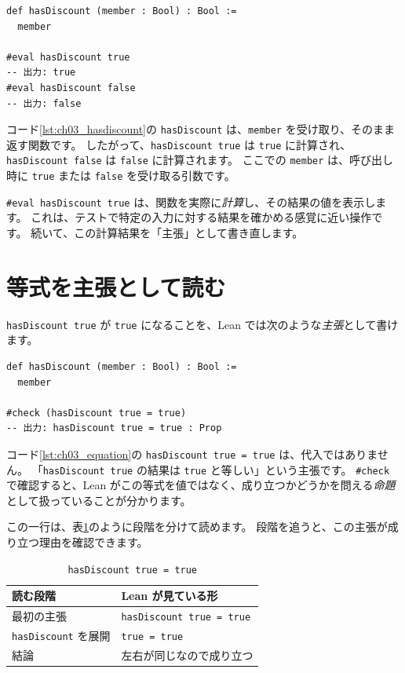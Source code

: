 \begin{listing}[htbp]
\begin{verbatim}
def hasDiscount (member : Bool) : Bool :=
  member

#eval hasDiscount true
-- 出力: true
#eval hasDiscount false
-- 出力: false
\end{verbatim}
\caption{\texttt{hasDiscount}}
\label{lst:ch03_hasdiscount}
\end{listing}

コード\ref{lst:ch03_hasdiscount}の \texttt{hasDiscount} は、\texttt{member} を受け取り、そのまま返す関数です。
したがって、\texttt{hasDiscount true} は \texttt{true} に計算され、\texttt{hasDiscount false} は \texttt{false} に計算されます。
ここでの \texttt{member} は、呼び出し時に \texttt{true} または \texttt{false} を受け取る引数です。

\texttt{\#eval hasDiscount true} は、関数を実際に\emph{計算}し、その結果の値を表示します。
これは、テストで特定の入力に対する結果を確かめる感覚に近い操作です。
続いて、この計算結果を「主張」として書き直します。

\section{等式を主張として読む}

\texttt{hasDiscount true} が \texttt{true} になることを、Lean では次のような\emph{主張}として書けます。

\begin{listing}[htbp]
\begin{verbatim}
def hasDiscount (member : Bool) : Bool :=
  member

#check (hasDiscount true = true)
-- 出力: hasDiscount true = true : Prop
\end{verbatim}
\caption{\texttt{hasDiscount true = true}}
\label{lst:ch03_equation}
\end{listing}

コード\ref{lst:ch03_equation}の \texttt{hasDiscount true = true} は、代入ではありません。
「\texttt{hasDiscount true} の結果は \texttt{true} と等しい」という主張です。
\texttt{\#check} で確認すると、Lean がこの等式を値ではなく、成り立つかどうかを問える\emph{命題}として扱っていることが分かります。

この一行は、表\ref{tab:ch03-reading}のように段階を分けて読めます。
段階を追うと、この主張が成り立つ理由を確認できます。

\begin{table}[htbp]
\centering
\caption{\texttt{hasDiscount true = true}}
\label{tab:ch03-reading}
\begin{tabular}{ll}
\toprule
読む段階 & Lean が見ている形 \\
\midrule
最初の主張 & \texttt{hasDiscount true = true} \\
\texttt{hasDiscount} を展開 & \texttt{true = true} \\
結論 & 左右が同じなので成り立つ \\
\bottomrule
\end{tabular}
\end{table}

